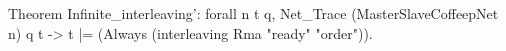 Theorem Infinite_interleaving':
  forall n t q,
   Net_Trace (MasterSlaveCoffeepNet n) q t ->
   t |= (Always (interleaving Rma "ready" "order")).